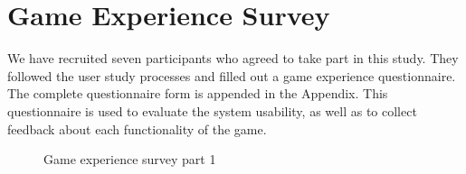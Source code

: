 \documentclass[msc,deptreport,ai]{infthesis}      %
\begin{document}
\section{Game Experience Survey}

We have recruited seven participants who agreed to take part in this study. They followed the user study processes and filled out a game experience questionnaire. The complete questionnaire form is appended in the Appendix. This questionnaire is used to evaluate the system usability, as well as to collect feedback about each functionality of the game.

\begin{figure}[htbp]
\center
{}\hspace{-1pt}%
\hspace{-1pt}%
\caption{Game experience survey part 1}
\label{fig:surveyPart1}
\end{figure}
\end{document}
